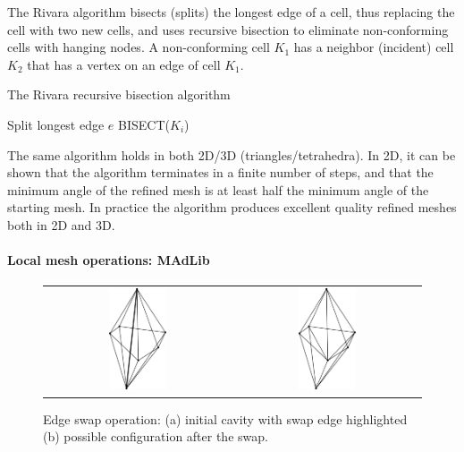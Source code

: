 The Rivara algorithm bisects (splits) the longest edge of a cell, thus
replacing the cell with two new cells, and uses recursive bisection to
eliminate non-conforming cells with hanging nodes. A non-conforming cell
$K_1$ has a neighbor (incident) cell $K_2$ that has a vertex on an edge
of cell $K_1$.
\begin{algorithm}
\caption{The Rivara recursive bisection algorithm}
\label{alg:rivara}
\begin{algorithmic}
\State Split longest edge $e$
\State BISECT($K_i$)
\EndWhile
\EndProcedure
\end{algorithmic}
\end{algorithm}
The same algorithm holds in both 2D/3D (triangles/tetrahedra). In 2D,
it can be shown \citep{Rivara1992} that the algorithm terminates in a
finite number of steps, and that the minimum angle of the refined mesh
is at least half the minimum angle of the starting mesh. In practice
the algorithm produces excellent quality refined meshes both in 2D and 3D.

\paragraph{Local mesh operations: MAdLib}

\begin{figure}
\begin{center}
\begin{tabular}{cc}
\centering
\includegraphics[height=3cm,width=6cm]{chapters/hoffman-2/pdf/swap.pdf} &
\hspace{0.3cm}
\includegraphics[height=3cm,width=6cm]{chapters/hoffman-2/pdf/swap_config1.pdf}
\end{tabular}
\end{center}
\caption{Edge swap operation: (a) initial cavity with swap edge
highlighted (b) possible configuration after the swap.}
\label{fig:op:eswap}
\end{figure}

